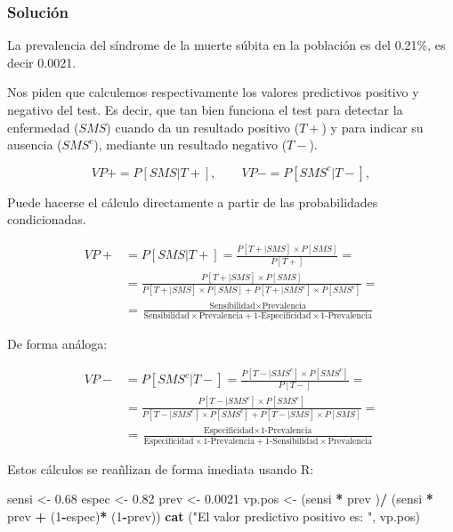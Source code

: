 \documentclass[
]{article}
\newenvironment{Shaded}{\begin{snugshade}}{\end{snugshade}}
\newcommand{\DecValTok}[1]{\textcolor[rgb]{0.00,0.00,0.81}{#1}}
\newcommand{\FloatTok}[1]{\textcolor[rgb]{0.00,0.00,0.81}{#1}}
\newcommand{\FunctionTok}[1]{\textcolor[rgb]{0.13,0.29,0.53}{\textbf{#1}}}
\newcommand{\NormalTok}[1]{#1}
\newcommand{\OtherTok}[1]{\textcolor[rgb]{0.56,0.35,0.01}{#1}}
\newcommand{\SpecialCharTok}[1]{\textcolor[rgb]{0.81,0.36,0.00}{\textbf{#1}}}
\newcommand{\StringTok}[1]{\textcolor[rgb]{0.31,0.60,0.02}{#1}}
\begin{document}
\subsubsection{Solución}\label{soluciuxf3n-4}

La prevalencia del síndrome de la muerte súbita en la población es del 0.21\%, es decir 0.0021.

Nos piden que calculemos respectivamente los valores predictivos positivo y negativo del test. Es decir, que tan bien funciona el test para detectar la enfermedad (\(SMS\)) cuando da un resultado positivo (\(T+\)) y para indicar su ausencia (\(SMS^c\)), mediante un resultado negativo (\(T-\)).

\[
VP+ = P[SMS | T+],\qquad VP- = P[SMS^c | T-],
\]

Puede hacerse el cálculo directamente a partir de las probabilidades condicionadas.

\[
\begin{aligned}
VP+ & = P[SMS | T+]= \frac {P[T+ | SMS]\times P[SMS]}{P[T+]} =\\
& = \frac {P[T+ | SMS]\times P[SMS]}
{P[T+|SMS]\times P[SMS]+ P[T+|SMS^c]\times P[SMS^c]}=\\
& = \frac{\text {Sensibilidad}\times \text{Prevalencia}}
{\text {Sensibilidad}\times \text{Prevalencia}+
\text {1-Especificidad}\times \text{1-Prevalencia}}
\end{aligned}
\]

De forma análoga:

\[
\begin{aligned}
VP- & = P[SMS^c | T-]= \frac {P[T- | SMS^c]\times P[SMS^c]}{P[T-]} =\\
& = \frac {P[T- | SMS^c]\times P[SMS^c]}{P[T- | SMS^c]\times P[SMS^c] + P[T- | SMS]\times P[SMS]}=\\
& = \frac{\text {Especificidad}\times \text{1-Prevalencia}}
{\text {Especificidad}\times \text{1-Prevalencia}+
\text {1-Sensibilidad}\times \text{Prevalencia}}
\end{aligned}
\]

Estos cálculos se reañlizan de forma imediata usando R:

\begin{Shaded}
\begin{Highlighting}[]
\NormalTok{sensi }\OtherTok{\textless{}{-}} \FloatTok{0.68}
\NormalTok{espec }\OtherTok{\textless{}{-}} \FloatTok{0.82}
\NormalTok{prev }\OtherTok{\textless{}{-}} \FloatTok{0.0021}
\NormalTok{vp.pos }\OtherTok{\textless{}{-}}\NormalTok{ (sensi }\SpecialCharTok{*}\NormalTok{ prev )}\SpecialCharTok{/}\NormalTok{ (sensi }\SpecialCharTok{*}\NormalTok{ prev }\SpecialCharTok{+}\NormalTok{ (}\DecValTok{1}\SpecialCharTok{{-}}\NormalTok{espec)}\SpecialCharTok{*}\NormalTok{ (}\DecValTok{1}\SpecialCharTok{{-}}\NormalTok{prev))}
\FunctionTok{cat}\NormalTok{ (}\StringTok{"El valor predictivo positivo es: "}\NormalTok{, vp.pos)}
\end{Highlighting}
\end{Shaded}
\end{document}
